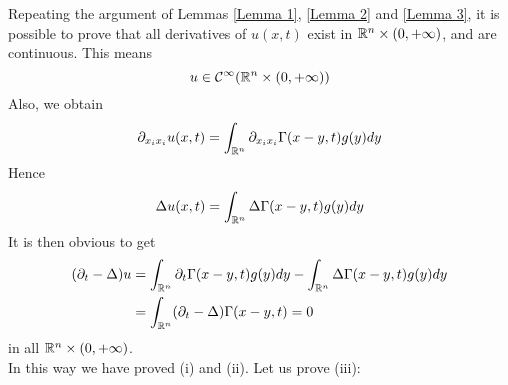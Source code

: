 Repeating the argument of Lemmas \ref{Lemma 1}, \ref{Lemma 2} and \ref{Lemma 3}, it is possible to prove that all derivatives of $u(x,t)$ exist in $\mathbb{R}^n \times (0,+\infty)$, and are continuous. This means 
\begin{equation*}
    u \in \mathcal{C}^\infty(\mathbb{R}^n \times (0,+\infty))
\end{equation*}
Also, we obtain
 \begin{equation*}
        \partial_{x_ix_i} u(x,t) = \int_{\mathbb{R}^n} \partial_{x_ix_i} \Gamma(x-y,t) g(y) dy
\end{equation*}
Hence
\begin{equation*}
    \Delta u(x,t) = \int_{\mathbb{R}^n} \Delta \Gamma(x-y,t) g(y) dy
\end{equation*}
It is then obvious to get 
\begin{align*}
    (\partial_t - \Delta) u &= \int_{\mathbb{R}^n} \partial_t \Gamma(x-y,t) g(y) dy - \int_{\mathbb{R}^n} \Delta \Gamma(x-y,t) g(y) dy \\
    &= \int_{\mathbb{R}^n} (\partial_t  - \Delta) \Gamma(x-y,t) = 0
\end{align*}
in all $\mathbb{R}^n \times (0,+\infty)$. \\
In this way we have proved (i) and (ii). Let us prove (iii):\\

